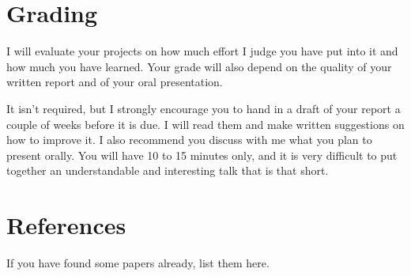 \documentclass{article}
\begin{document}
\section{Grading}

I will evaluate your projects on how much effort I judge you have put
into it and how much you have learned.  Your grade will also depend on
the quality of your written report and of your oral presentation.  

It isn't required, but I strongly encourage you to hand in a draft of
your report a couple of weeks before it is due.  I will read them and
make written suggestions on how to improve it.  I also recommend you
discuss with me what you plan to present orally.  You will have 10 to
15 minutes only, and it is very difficult to put together an
understandable and interesting talk that is that short.

\section{References}

If you have found some papers already, list them here.
\end{document}
